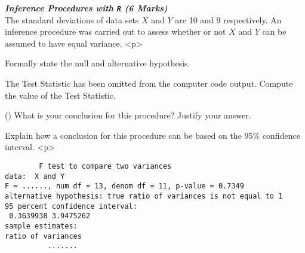 

\item[(d)] \textbf{\textit{Inference Procedures with \texttt{R} (6 Marks)}}\\
The standard deviations of data sets $X$ and $Y$ are 10 and 9 respectively. 
An inference procedure was carried out to assess whether or not $X$ and $Y$ can be assumed to have equal variance.
<p>
\item[i.] Formally state the null and alternative hypothesis.

\item[ii.] The Test Statistic has been omitted from the computer code output. Compute the value of the Test Statistic.

\item[iii.]() What is your conclusion for this procedure? Justify your answer.

\item[iv.] Explain how a conclusion for this procedure can be based on the $95\%$ confidence interval.
<p>


\begin{verbatim}
        F test to compare two variances
data:  X and Y
F = ......, num df = 13, denom df = 11, p-value = 0.7349
alternative hypothesis: true ratio of variances is not equal to 1
95 percent confidence interval:
 0.3639938 3.9475262
sample estimates:
ratio of variances
          .......
\end{verbatim}

